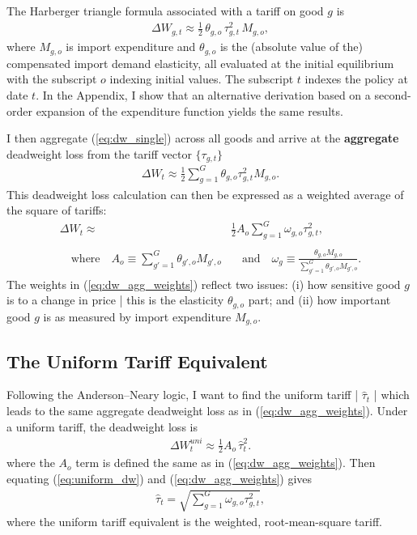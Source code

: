 \documentclass[12pt,pdftex]{article}
\begin{document}
\begin{onehalfspacing}
The Harberger triangle formula associated with a tariff on good $g$ is
\begin{align}
  \Delta W_{g,t} \approx \frac{1}{2}\,\theta_{g,o}\,\tau_{g,t}^2\,M_{g,o},
  \label{eq:dw_single}
\end{align}
where $M_{g,o}$ is import expenditure and $\theta_{g,o}$ is the (absolute value of the) compensated import demand elasticity, all evaluated at the initial equilibrium with the subscript $o$ indexing initial values. The subscript $t$ indexes the policy at date $t$. In the Appendix, I show that an alternative derivation based on a second-order expansion of the expenditure function yields the same results.

I then aggregate (\ref{eq:dw_single}) across all goods and arrive at the \textbf{aggregate} deadweight loss from the tariff vector $\{\tau_{g,t}\}$
\begin{align}
  \Delta W_t \approx \frac{1}{2} \sum_{g=1}^G \theta_{g,o} \tau_{g,t}^2 M_{g,o}.
  \label{eq:dw_agg}
\end{align}
This deadweight loss calculation can then be expressed as a weighted average of the square of tariffs:
\begin{align}
\Delta W_t \approx & \frac{1}{2} A_o \sum_{g=1}^G \omega_{g,o} \tau_{g,t}^2, \label{eq:dw_agg_weights} \\
\nonumber \\
\quad \mbox{where} \quad A_{o} \equiv \sum_{g'=1}^G \theta_{g',o} M_{g',o} &\quad \mbox{and} \quad \omega_g \equiv \frac{\theta_{g,o} M_{g,o}}{\sum\limits_{g'=1}^G \theta_{g',o} M_{g',o}}. \nonumber
\end{align}
The weights in (\ref{eq:dw_agg_weights}) reflect two issues: (i) how sensitive good $g$ is to a change in price | this is the elasticity $\theta_{g,o}$ part; and (ii) how important good $g$ is as measured by import expenditure $M_{g,o}$.

\subsection{The Uniform Tariff Equivalent}

Following the Anderson--Neary logic, I want to find the uniform tariff | $\hat{\tau}_{t}$ | which leads to the same aggregate deadweight loss as in (\ref{eq:dw_agg_weights}). Under a uniform tariff, the deadweight loss is
\begin{align}
\Delta W^{uni}_t \approx \frac{1}{2} A_{o}\, \hat{\tau}_{t}^2.
\label{eq:uniform_dw}
\end{align}
where the $A_{o}$ term is defined the same as in (\ref{eq:dw_agg_weights}). Then equating (\ref{eq:uniform_dw}) and (\ref{eq:dw_agg_weights}) gives
\begin{align}
\hat{\tau}_{t} = \sqrt{\sum_{g=1}^G \omega_{g,o} \tau_{g,t}^2},
\label{eq:TRI1}
\end{align}
where the uniform tariff equivalent is the weighted, root-mean-square tariff.


\end{onehalfspacing}
\end{document}
